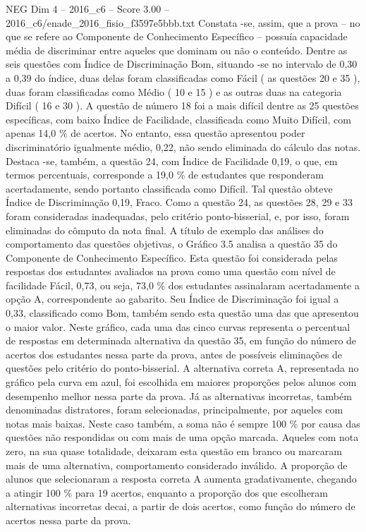 \begin{textsample}{NEG Dim 4 – 2016\_c6 – Score 3.00 – 2016\_c6/enade\_2016\_fisio\_f3597e5bbb.txt}
Constata -se, assim, que a prova – no que se refere ao Componente de Conhecimento Específico – possuía capacidade média de discriminar entre aqueles que dominam ou não o conteúdo.
Dentre as seis questões com Índice de Discriminação Bom, situando -se no intervalo de 0,30 a 0,39 do índice, duas delas foram classificadas como Fácil ( as questões 20 e 35 ), duas foram classificadas como Médio ( 10 e 15 ) e as outras duas na categoria Difícil ( 16 e 30 ).
A questão de número 18 foi a mais difícil dentre as 25 questões específicas, com baixo Índice de Facilidade, classificada como Muito Difícil, com apenas 14,0 \% de acertos.
No entanto, essa questão apresentou poder discriminatório igualmente médio, 0,22, não sendo eliminada do cálculo das notas.
Destaca -se, também, a questão 24, com Índice de Facilidade 0,19, o que, em termos percentuais, corresponde a 19,0 \% de estudantes que responderam acertadamente, sendo portanto classificada como Difícil.
Tal questão obteve Índice de Discriminação 0,19, Fraco.
Como a questão 24, as questões 28, 29 e 33 foram consideradas inadequadas, pelo critério ponto-bisserial, e, por isso, foram eliminadas do cômputo da nota final.
A título de exemplo das análises do comportamento das questões objetivas, o Gráfico 3.5 analisa a questão 35 do Componente de Conhecimento Específico.
Esta questão foi considerada pelas respostas dos estudantes avaliados na prova como uma questão com nível de facilidade Fácil, 0,73, ou seja, 73,0 \% dos estudantes assinalaram acertadamente a opção A, correspondente ao gabarito.
Seu Índice de Discriminação foi igual a 0,33, classificado como Bom, também sendo esta questão uma das que apresentou o maior valor.
Neste gráfico, cada uma das cinco curvas representa o percentual de respostas em determinada alternativa da questão 35, em função do número de acertos dos estudantes nessa parte da prova, antes de possíveis eliminações de questões pelo critério do ponto-bisserial.
A alternativa correta A, representada no gráfico pela curva em azul, foi escolhida em maiores proporções pelos alunos com desempenho melhor nessa parte da prova.
Já as alternativas incorretas, também denominadas distratores, foram selecionadas, principalmente, por aqueles com notas mais baixas.
Neste caso também, a soma não é sempre 100 \% por causa das questões não respondidas ou com mais de uma opção marcada.
Aqueles com nota zero, na sua quase totalidade, deixaram esta questão em branco ou marcaram mais de uma alternativa, comportamento considerado inválido.
A proporção de alunos que selecionaram a resposta correta A aumenta gradativamente, chegando a atingir 100 \% para 19 acertos, enquanto a proporção dos que escolheram alternativas incorretas decai, a partir de dois acertos, como função do número de acertos nessa parte da prova.

\end{textsample}

